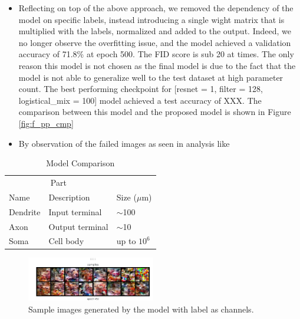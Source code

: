 \documentclass{article}
\begin{document}
\begin{itemize}
    \item Reflecting on top of the above approach, we removed the dependency of the model on specific labels, instead introducing a single wight matrix that is multiplied with the labels, normalized and added to the output. Indeed, we no longer observe the overfitting issue, and the model achieved a validation accuracy of 71.8\% at epoch 500. The FID score is sub 20 at times. The only reason this model is not chosen as the final model is due to the fact that the model is not able to generalize well to the test dataset at high parameter count. The best performing checkpoint for [resnet = 1, filter = 128, logistical\_mix = 100] model achieved a test accuracy of XXX. The comparison between this model and the proposed model is shown in Figure \ref{fig:f_pp_cmp}
    \item By observation of the failed images as seen in analysis like 
\end{itemize}

\begin{table}
    \caption{Model Comparison}
    \label{model_cmp}
    \centering
    \begin{tabular}{lll}
      \toprule
      \multicolumn{2}{c}{Part}                   \\
      \cmidrule(r){1-2}
      Name     & Description     & Size ($\mu$m) \\
      \midrule
      Dendrite & Input terminal  & $\sim$100     \\
      Axon     & Output terminal & $\sim$10      \\
      Soma     & Cell body       & up to $10^6$  \\
      \bottomrule
    \end{tabular}
\end{table}

\begin{figure}
    \centering
    \includegraphics[width=0.5\textwidth]{report_data/f-lc-samples.png}
    \caption{ Sample images generated by the model with label as channels.}
    \label{fig:f-lc-samples}
\end{figure}
\end{document}
